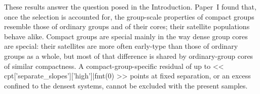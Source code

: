 \documentclass{aa}
\newcommand{\Rmed}{\langle R_{ij}\rangle}
\newcommand{\zenodoDOI}{\textbf{[ZENODO DOI TO BE INSERTED]}}
\begin{document}
These results answer the question posed in the Introduction. Paper~I found that, once the selection is accounted for, the group-scale properties of compact groups resemble those of ordinary groups and of their cores; their satellite populations behave alike. Compact groups are special mainly in the way dense group cores are special: their satellites are more often early-type than those of ordinary groups as a whole, but most of that difference is shared by ordinary-group cores of similar compactness. A compact-group-specific residual of up to << cpt['separate_slopes']['high']|fmt(0) >> points at fixed separation, or an excess confined to the densest systems, cannot be excluded with the present samples.

\end{document}
